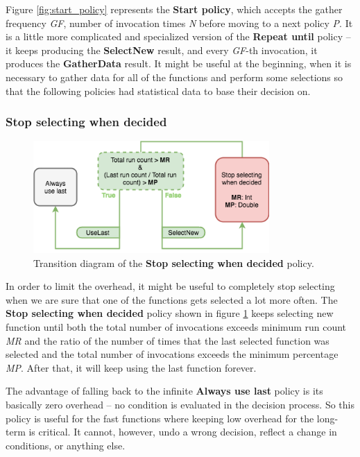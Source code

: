 Figure \ref{fig:start_policy} represents the \textbf{Start policy}, which accepts the gather frequency \textit{GF}, number of invocation times \textit{N} before moving to a next policy \textit{P}. It is a little more complicated and specialized version of the \textbf{Repeat until} policy -- it keeps producing the \textbf{SelectNew} result, and every \textit{GF}-th invocation, it produces the \textbf{GatherData} result. It might be useful at the beginning, when it is necessary to gather data for all of the functions and perform some selections so that the following policies had statistical data to base their decision on.

\subsubsection{Stop selecting when decided}

\begin{figure}[h!]
	\captionsetup{justification=centering,margin=0.5cm}
	\centerline{\mbox{\includegraphics[width=90mm]{./img/stop_selecting_when_decided.png}}}
	\caption{Transition diagram of the \textbf{Stop selecting  when decided} policy.}
	\label{fig:stop_selecting_when_decided}
\end{figure}

In order to limit the overhead, it might be useful to completely stop selecting when we are sure that one of the functions gets selected a lot more often. The \textbf{Stop selecting when decided} policy shown in figure \ref{fig:stop_selecting_when_decided} keeps selecting new function until both the total number of invocations exceeds minimum run count \textit{MR} and the ratio of the number of times that the last selected function was selected and the total number of invocations exceeds the minimum percentage \textit{MP}. After that, it will keep using the last function forever. 

The advantage of falling back to the infinite \textbf{Always use last} policy is its basically zero overhead -- no condition is evaluated in the decision process. So this policy is useful for the fast functions where keeping low overhead for the long-term is critical. It cannot, however, undo a wrong decision, reflect a change in conditions, or anything else.

